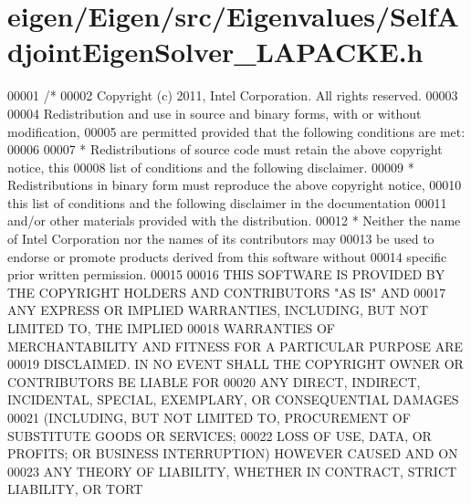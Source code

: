 \hypertarget{eigen_2_eigen_2src_2_eigenvalues_2_self_adjoint_eigen_solver___l_a_p_a_c_k_e_8h_source}{}\section{eigen/\+Eigen/src/\+Eigenvalues/\+Self\+Adjoint\+Eigen\+Solver\+\_\+\+L\+A\+P\+A\+C\+KE.h}
\label{eigen_2_eigen_2src_2_eigenvalues_2_self_adjoint_eigen_solver___l_a_p_a_c_k_e_8h_source}

\begin{DoxyCode}
00001 \textcolor{comment}{/*}
00002 \textcolor{comment}{ Copyright (c) 2011, Intel Corporation. All rights reserved.}
00003 \textcolor{comment}{}
00004 \textcolor{comment}{ Redistribution and use in source and binary forms, with or without modification,}
00005 \textcolor{comment}{ are permitted provided that the following conditions are met:}
00006 \textcolor{comment}{}
00007 \textcolor{comment}{ * Redistributions of source code must retain the above copyright notice, this}
00008 \textcolor{comment}{   list of conditions and the following disclaimer.}
00009 \textcolor{comment}{ * Redistributions in binary form must reproduce the above copyright notice,}
00010 \textcolor{comment}{   this list of conditions and the following disclaimer in the documentation}
00011 \textcolor{comment}{   and/or other materials provided with the distribution.}
00012 \textcolor{comment}{ * Neither the name of Intel Corporation nor the names of its contributors may}
00013 \textcolor{comment}{   be used to endorse or promote products derived from this software without}
00014 \textcolor{comment}{   specific prior written permission.}
00015 \textcolor{comment}{}
00016 \textcolor{comment}{ THIS SOFTWARE IS PROVIDED BY THE COPYRIGHT HOLDERS AND CONTRIBUTORS "AS IS" AND}
00017 \textcolor{comment}{ ANY EXPRESS OR IMPLIED WARRANTIES, INCLUDING, BUT NOT LIMITED TO, THE IMPLIED}
00018 \textcolor{comment}{ WARRANTIES OF MERCHANTABILITY AND FITNESS FOR A PARTICULAR PURPOSE ARE}
00019 \textcolor{comment}{ DISCLAIMED. IN NO EVENT SHALL THE COPYRIGHT OWNER OR CONTRIBUTORS BE LIABLE FOR}
00020 \textcolor{comment}{ ANY DIRECT, INDIRECT, INCIDENTAL, SPECIAL, EXEMPLARY, OR CONSEQUENTIAL DAMAGES}
00021 \textcolor{comment}{ (INCLUDING, BUT NOT LIMITED TO, PROCUREMENT OF SUBSTITUTE GOODS OR SERVICES;}
00022 \textcolor{comment}{ LOSS OF USE, DATA, OR PROFITS; OR BUSINESS INTERRUPTION) HOWEVER CAUSED AND ON}
00023 \textcolor{comment}{ ANY THEORY OF LIABILITY, WHETHER IN CONTRACT, STRICT LIABILITY, OR TORT}

\end{DoxyCode}
